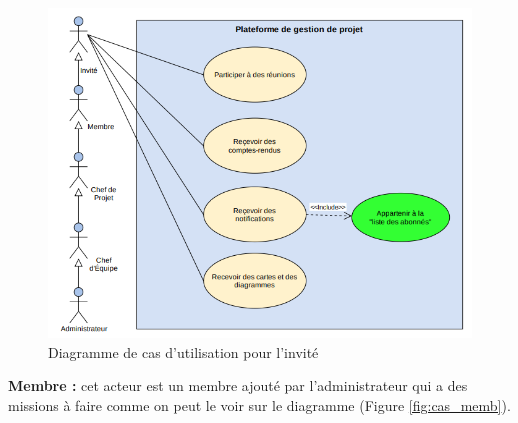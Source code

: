 \begin{figure}[h]
    \centering
    \includegraphics[scale=0.7]{figures/a4.png}
    \caption{Diagramme de cas d’utilisation pour l’invité}
    \label{fig:cas_invi}
\end{figure}
\newpage\par \textbf{	Membre :} cet acteur est un membre ajouté par l'administrateur qui a des missions à faire comme on peut le voir sur le diagramme (Figure \ref{fig:cas_memb}).

